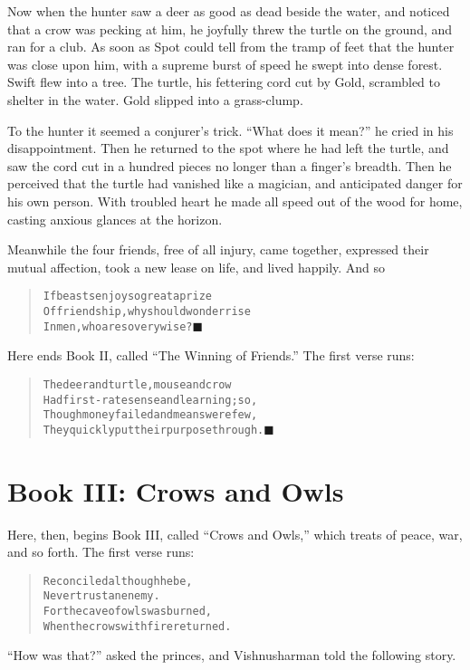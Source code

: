 \documentclass[article, twoside, 14pt]{memoir}
\newcommand{\qed}{\hfill \ensuremath{\blacksquare}}
\renewenvironment{verbatim}{%
\begin{quote}%
\vskip -10pt%
\begin{alltt}\normalfont\large}{\end{alltt}%
\end{quote}%
\vskip -10pt
} %
\begin{document}
Now when the hunter saw a deer as good as dead beside the
water, and noticed that a crow was pecking at him, he joyfully
threw the turtle on the ground, and ran for a club. As soon as Spot
could tell from the tramp of feet that the hunter was close upon
him, with a supreme burst of speed he swept into dense forest.
Swift flew into a tree. The turtle, his fettering cord cut by Gold,
scrambled to shelter in the water. Gold slipped into a
grass-clump.

To the hunter it seemed a conjurer's trick. ``What does it mean?''
he cried in his disappointment. Then he returned to the spot where
he had left the turtle, and saw the cord cut in a hundred pieces no
longer than a finger's breadth. Then he perceived that the turtle
had vanished like a magician, and anticipated danger for his own
person. With troubled heart he made all speed out of the wood for
home, casting anxious glances at the horizon.

Meanwhile the four friends, free of all injury, came together,
expressed their mutual affection, took a new lease on life, and
lived happily. And so

\begin{verbatim}
If beasts enjoy so great a prize
Of friendship, why should wonder rise
In men, who are so very wise?\hyperref[s36]{\qed}
\end{verbatim}
Here ends Book II, called ``The Winning of Friends.'' The first
verse runs:

\begin{verbatim}
The deer and turtle, mouse and crow
Had first-rate sense and learning; so,
Though money failed and means were few,
They quickly put their purpose through.\hyperref[s35]{\qed}
\end{verbatim}
\part{Book III: Crows and Owls}

\label{s46}

Here, then, begins Book III, called ``Crows and Owls,'' which
treats of peace, war, and so forth. The first verse runs:

\begin{verbatim}
Reconciled although he be,
Never trust an enemy.
For the cave of owls was burned,
When the crows with fire returned.
\end{verbatim}
``How was that?'' asked the princes, and Vishnusharman told the
following story.
\end{document}
